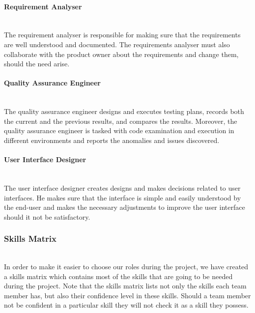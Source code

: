 \documentclass[../document.tex]{subfiles}
\begin{document}
\paragraph{Requirement Analyser} \ \\
The requirement analyser is responsible for making sure that the requirements are well understood and documented. The requirements analyser must also collaborate with the product owner about the requirements and change them, should the need arise.

\paragraph{Quality Assurance Engineer} \ \\
The quality assurance engineer designs and executes testing plans, records both the current and the previous results, and compares the results. Moreover, the quality assurance engineer is tasked with code examination and execution in different environments and reports the anomalies and issues discovered. 

\paragraph{User Interface Designer} \ \\
The user interface designer creates designs and makes decisions related to user interfaces. He makes sure that the interface is simple and easily understood by the end-user and makes the necessary adjustments to improve the user interface should it not be satisfactory.

\subsubsection{Skills Matrix} \ \\
In order to make it easier to choose our roles during the project, we have created a skills matrix which contains most of the skills that are going to be needed during the project. Note that the skills matrix lists not only the skills each team member has, but also their confidence level in these skills. Should a team member not be confident in a particular skill they will not check it as a skill they possess.
\end{document}
